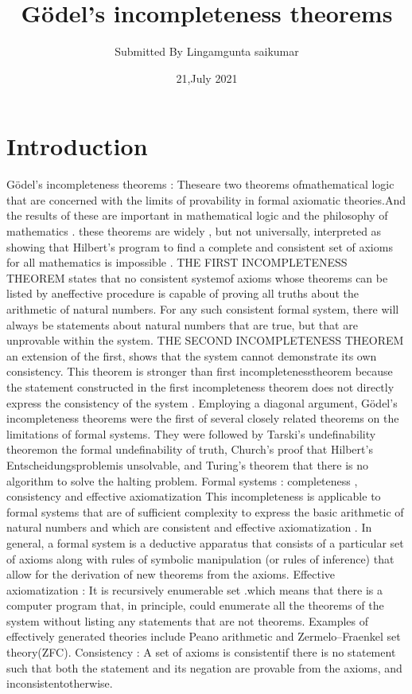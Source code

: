 \documentclass{article}
\title{Gödel's incompleteness theorems}
\author{Submitted By Lingamgunta saikumar}
\date{21,July 2021}
\begin{document}
\maketitle

\section{Introduction}
Gödel's incompleteness theorems : 
Theseare two theorems ofmathematical logic that are concerned with the limits of 
provability in formal axiomatic theories.And the results of these are important in 
mathematical logic and the philosophy of mathematics . these theorems are widely , but not 
universally, interpreted as showing that Hilbert’s program to find a complete and consistent 
set of axioms for all mathematics is impossible .
THE FIRST INCOMPLETENESS THEOREM states that no consistent systemof axioms whose 
theorems can be listed by aneffective procedure is capable of proving all truths about the 
arithmetic of natural numbers. For any such consistent formal system, there will always be 
statements about natural numbers that are true, but that are unprovable within the system. 
THE SECOND INCOMPLETENESS THEOREM an extension of the first, shows that the system 
cannot demonstrate its own consistency.
This theorem is stronger than first incompletenesstheorem because the statement 
constructed in the first incompleteness theorem does not directly express the consistency 
of the system .
Employing a diagonal argument, Gödel's incompleteness theorems were the first of several 
closely related theorems on the limitations of formal systems. They were followed 
by Tarski's undefinability theoremon the formal undefinability of truth, Church's proof that 
Hilbert's Entscheidungsproblemis unsolvable, and Turing's theorem that there is no 
algorithm to solve the halting problem.
Formal systems : completeness , consistency and effective axiomatization 
This incompleteness is applicable to formal systems that are of sufficient complexity to 
express the basic arithmetic of natural numbers and which are consistent and effective 
axiomatization .
In general, a formal system is a deductive apparatus that consists of a particular set of 
axioms along with rules of symbolic manipulation (or rules of inference) that allow for 
the derivation of new theorems from the axioms.
Effective axiomatization :
It is recursively enumerable set .which means that there is a computer program that, in 
principle, could enumerate all the theorems of the system without listing any statements 
that are not theorems. Examples of effectively generated theories include Peano arithmetic 
and Zermelo–Fraenkel set theory(ZFC).
Consistency : 
A set of axioms is consistentif there is no statement such that both the statement and 
its negation are provable from the axioms, and inconsistentotherwise.
\end{document}
